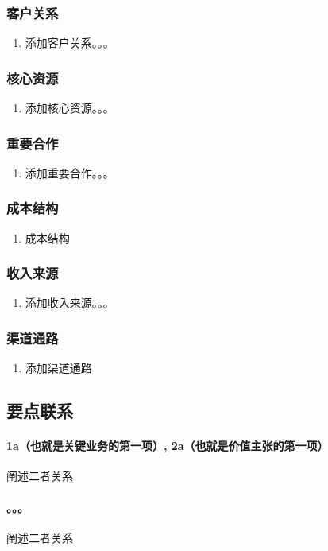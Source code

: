 \documentclass[a4paper]{ctexart}
\begin{document}
\subsubsection{客户关系}

\begin{enumerate}[label=\alph*.]
  \item 添加客户关系。。。
\end{enumerate}

\subsubsection{核心资源}

\begin{enumerate}[label=\alph*.]
  \item 添加核心资源。。。
\end{enumerate}

\subsubsection{重要合作}

\begin{enumerate}[label=\alph*.]
  \item 添加重要合作。。。
\end{enumerate}

\subsubsection{成本结构}

\begin{enumerate}[label=\alph*.]
  \item 成本结构
\end{enumerate}

\subsubsection{收入来源}

\begin{enumerate}[label=\alph*.]
  \item 添加收入来源。。。
\end{enumerate}

\subsubsection{渠道通路}

\begin{enumerate}[label=\alph*.]
  \item 添加渠道通路
\end{enumerate}


\subsection{要点联系}

\paragraph{1a（也就是关键业务的第一项）, 2a（也就是价值主张的第一项）}阐述二者关系
\paragraph{。。。}阐述二者关系
\end{document}

